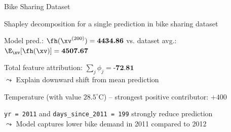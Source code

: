 \documentclass[10pt,compress,t,notes=noshow, xcolor=table]{beamer}
\begin{document}
\begin{framev}[align=top]{Bike Sharing Dataset}

\begin{itemizeM}%
\item Shapley decomposition for a single prediction in bike sharing dataset %
\item Model pred.: $\fh(\xv^{(200)}) = \textbf{4434.86}$ vs. dataset avg.: $\E_{\xv}[\fh(\xv)] = \textbf{4507.67}$
\item Total feature attribution: $\sum_j \phi_j = \textbf{-72.81}$\\
$\leadsto$ Explain downward shift from mean prediction
\item Temperature (with value $28.5^\circ$C) -- strongest positive contributor: $+400$
\item \texttt{yr = 2011} and \texttt{days\_since\_2011 = 199} strongly reduce prediction\\
$\leadsto$ Model captures lower bike demand in 2011 compared to 2012
\end{itemizeM}
\end{framev}



\end{document}
